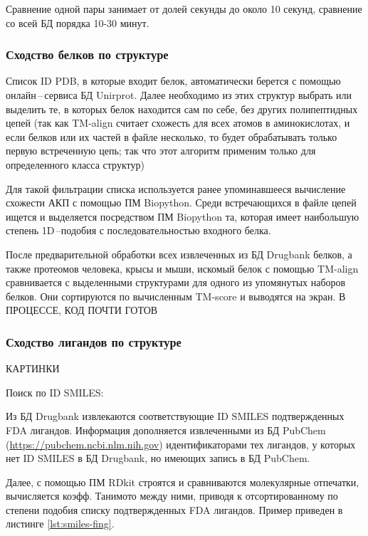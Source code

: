 \documentclass[a4paper,14pt]{article}         %
\begin{document}
Сравнение одной пары занимает от долей секунды до около 10 секунд, сравнение со всей БД порядка 10-30 минут.
\subsubsection{Сходство белков по структуре}
Список ID PDB, в которые входит белок, автоматически берется с помощью онлайн\,--\,сервиса БД Unirprot. Далее необходимо из этих структур выбрать или выделить те, в которых белок находится сам по себе, без других полипептидных цепей (так как TM-align считает схожесть для всех атомов в аминокислотах, и если белков или их частей в файле несколько, то будет обрабатывать только первую встреченную цепь; так что этот алгоритм применим только для определенного класса структур)

Для такой фильтрации списка используется ранее упоминавшееся вычисление схожести АКП с помощью ПМ Biopython. Среди встречающихся в файле цепей ищется и выделяется посредством ПМ Biopython та, которая имеет наибольшую степень 1D\,--подобия с последовательностью входного белка.

После предварительной обработки всех извлеченных из БД Drugbank белков, а также протеомов человека, крысы и мыши, искомый белок с помощью TM-align сравнивается с выделенными структурами для одного из упомянутых наборов белков. Они сортируются по вычисленным TM-score и выводятся на экран.
\color{orange} В ПРОЦЕССЕ, КОД ПОЧТИ ГОТОВ
\color{black}
\subsubsection{Сходство лигандов по структуре}
\color{orange} КАРТИНКИ
\color{black}

Поиск по ID SMILES:

Из БД Drugbank извлекаются соответствующие ID SMILES подтвержденных FDA лигандов. Информация дополняется извлеченными из БД PubChem (\href{https://pubchem.ncbi.nlm.nih.gov}{https://pubchem.ncbi.nlm.nih.gov}) идентификаторами тех лигандов, у которых нет ID SMILES в БД Drugbank, но имеющих запись в БД PubChem.

Далее, с помощью ПМ RDkit строятся и сравниваются молекулярные отпечатки, вычисляется коэфф. Танимото между ними, приводя к отсортированному по степени подобия списку подтвержденных FDA лигандов. Пример приведен в листинге \ref{lst:smiles-fing}.
\end{document}

